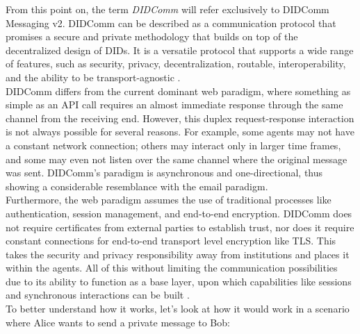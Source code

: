 From this point on, the term \emph{DIDComm} will refer exclusively to DIDComm Messaging v2. DIDComm can be described as a communication protocol that promises a secure and private methodology that builds on top of the decentralized design of DIDs. It is a versatile protocol that supports a wide range of features, such as security, privacy, decentralization, routable, interoperability, and the ability to be transport-agnostic \cite{curren_looker_terbu_2020}.\\
DIDComm differs from the current dominant web paradigm, where something as simple as an API call requires an almost immediate response through the same channel from the receiving end. However, this duplex request-response interaction is not always possible for several reasons. For example, some agents may not have a constant network connection; others may interact only in larger time frames, and some may even not listen over the same channel where the original message was sent. DIDComm's paradigm is asynchronous and one-directional, thus showing a considerable resemblance with the email paradigm. \\
Furthermore, the web paradigm assumes the use of traditional processes like authentication, session management, and end-to-end encryption. DIDComm does not require certificates from external parties to establish trust, nor does it require constant connections for end-to-end transport level encryption like TLS. This takes the security and privacy responsibility away from institutions and places it within the agents. All of this without limiting the communication possibilities due to its ability to function as a base layer, upon which capabilities like sessions and synchronous interactions can be built \cite{curren_looker_terbu_2020}.\\ 
To better understand how it works, let's look at how it would work in a scenario where Alice wants to send a private message to Bob: 

